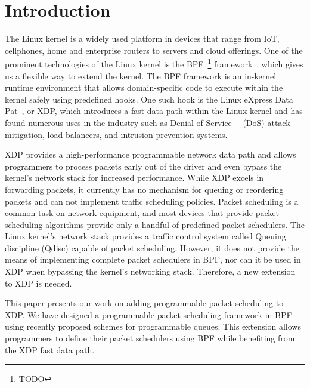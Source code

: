 \documentclass[sigconf, nonacm]{acmart}
\begin{document}

\maketitle

\section{Introduction}

The Linux kernel is a widely used platform in devices that range from IoT, cellphones, home and enterprise routers to servers and cloud offerings. One of the prominent technologies of the Linux kernel is the BPF~\footnote{TODO} framework~\cite{ebpf}, which gives us a flexible way to extend the kernel. The BPF framework is an in-kernel runtime environment that allows domain-specific code to execute within the kernel safely using predefined hooks. One such hook is the Linux eXpress Data Pat~\cite{hoiland2018express}, or XDP, which introduces a fast data-path within the Linux kernel and has found numerous uses in the industry such as Denial-of-Service~\cite{bertin2017xdp}~\cite{miano2019introducing} (DoS) attack-mitigation, load-balancers, and intrusion prevention systems.

XDP provides a high-performance programmable network data path and allows programmers to process packets early out of the driver and even bypass the kernel's network stack for increased performance. While XDP excels in forwarding packets, it currently has no mechanism for queuing or reordering packets and can not implement traffic scheduling policies. Packet scheduling is a common task on network equipment, and most devices that provide packet scheduling algorithms provide only a handful of predefined packet schedulers. The Linux kernel's network stack provides a traffic control system called Queuing discipline (Qdisc) capable of packet scheduling. However, it does not provide the means of implementing complete packet schedulers in BPF, nor can it be used in XDP when bypassing the kernel's networking stack. Therefore, a new extension to XDP is needed.

This paper presents our work on adding programmable packet scheduling to XDP. We have designed a programmable packet scheduling framework in BPF using recently proposed schemes for programmable queues. This extension allows programmers to define their packet schedulers using BPF while benefiting from the XDP fast data path.
\end{document}

